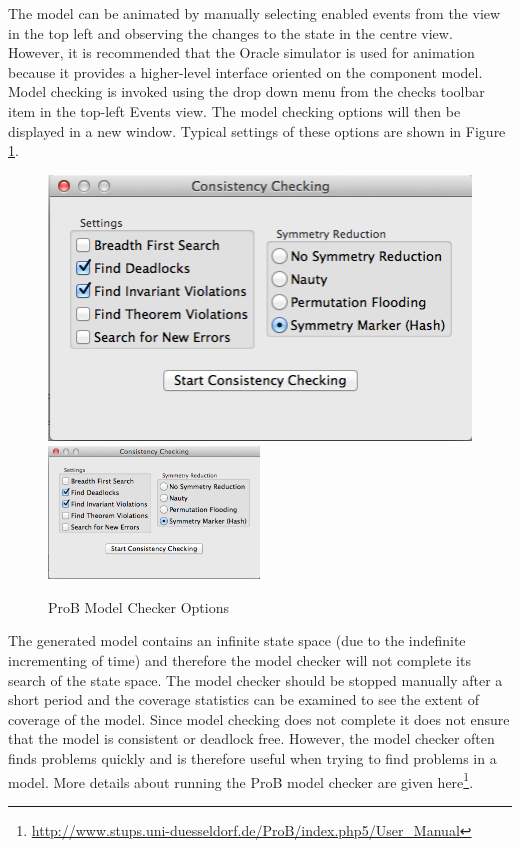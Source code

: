 The model can be animated by manually selecting enabled events from the view in the top left and observing the changes to the state in the centre view. However, it is recommended that the Oracle simulator is used for animation because it provides a higher-level interface oriented on the component model.
Model checking is invoked using the drop down menu from the checks toolbar item in the top-left Events view. The model checking options will then be displayed in a new window. Typical settings of these options are shown in Figure \ref{fig:ProBModelCheckerOptions}.

 
 \begin{figure}[!htbp]
  \centering
  \ifplastex
  \includegraphics[width=512]{figures/image9.png}
  \else
  \includegraphics[width=0.5\textwidth]{figures/image9.png}
  \fi
  \caption{ProB Model Checker Options}
  \label{fig:ProBModelCheckerOptions}
\end{figure}


The generated model contains an infinite state space (due to the indefinite incrementing of time) and therefore the model checker will not complete its search of the state space. The model checker should be stopped manually after a short period and the coverage statistics can be examined to see the extent of coverage of the model. Since model checking does not complete it does not ensure that the model is consistent or deadlock free. However, the model checker often finds problems quickly and is therefore useful when trying to find problems in a model.
More details about running the ProB model checker are given here\footnote{\url{http://www.stups.uni-duesseldorf.de/ProB/index.php5/User_Manual}}.


